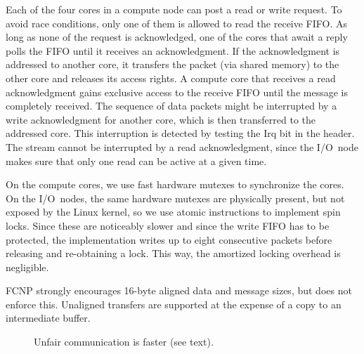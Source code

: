 \documentclass[conference]{worldcomp}
\begin{document}
Each of the four cores in a compute node can post a read or write request.
To avoid race conditions, only one of them is allowed to read the receive FIFO.
As long as none of the request is acknowledged, one of the cores that await
a reply polls the FIFO until it receives an acknowledgment.
If the acknowledgment is addressed to another core, it transfers the packet
(via shared memory) to the other core and releases its access rights.
A compute core that receives a read acknowledgment gains exclusive access to
the receive FIFO until the message is completely received.
The sequence of data packets might be interrupted by a write acknowledgment
for another core, which is then transferred to the addressed core.
This interruption is detected by testing the Irq bit in the header.
The stream cannot be interrupted by a read acknowledgment, since the I/O~node
makes sure that only one read can be active at a given time.

On the compute cores, we use fast hardware mutexes to synchronize the cores.
On the I/O~nodes, the same hardware mutexes are physically present, but not
exposed by the Linux kernel, so we use atomic instructions to implement spin
locks.
Since these are noticeably slower and since the write FIFO has to be protected,
the implementation writes up to eight consecutive packets before releasing
and re-obtaining a lock.
This way, the amortized locking overhead is negligible.

FCNP strongly encourages 16-byte aligned data and message sizes, but
does not enforce this.
Unaligned transfers are supported at the expense of a copy to an
intermediate buffer.

\begin{figure}[h]
\begin{center}
\begin{vbox}
\end{vbox}
\vspace{5mm}
\end{center}
\caption{Unfair communication is faster (see text).}
\label{fig:fair-unfair}
\end{figure}
\end{document}
